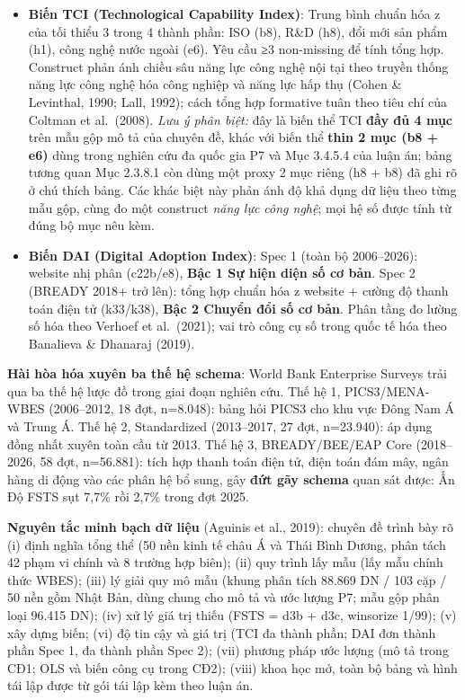 \documentclass[
  a4paper,
  13pt]{extreport}
\begin{document}
\begin{itemize}
{  trực tiếp} của doanh nghiệp (trực tiếp), và được ghi rõ trong phần dữ
  liệu của từng nghiên cứu.
\item
  \textbf{Biến TCI (Technological Capability Index)}: Trung bình chuẩn
  hóa z của tối thiểu 3 trong 4 thành phần: ISO (b8), R\&D (h8), đổi mới
  sản phẩm (h1), công nghệ nước ngoài (e6). Yêu cầu ≥3 non-missing để
  tính tổng hợp. Construct phản ánh chiều sâu năng lực công nghệ nội tại
  theo truyền thống năng lực công nghệ hóa công nghiệp và năng lực hấp
  thụ (Cohen \& Levinthal, 1990; Lall, 1992); cách tổng hợp formative
  tuân theo tiêu chí của Coltman et al.~(2008). \emph{Lưu ý phân biệt:}
  đây là biến thể TCI \textbf{đầy đủ 4 mục} trên mẫu gộp mô tả của
  chuyên đề, khác với biến thể \textbf{thin 2 mục (b8 + e6)} dùng trong
  nghiên cứu đa quốc gia P7 và Mục 3.4.5.4 của luận án; bảng tương quan
  Mục 2.3.8.1 còn dùng một proxy 2 mục riêng (h8 + b8) đã ghi rõ ở chú
  thích bảng. Các khác biệt này phản ánh độ khả dụng dữ liệu theo từng
  mẫu gộp, cùng đo một construct \emph{năng lực công nghệ}; mọi hệ số
  được tính từ đúng bộ mục nêu kèm.
\item
  \textbf{Biến DAI (Digital Adoption Index)}: Spec 1 (toàn bộ
  2006--2026): website nhị phân (c22b/e8), \textbf{Bậc 1 Sự hiện diện số
  cơ bản}. Spec 2 (BREADY 2018+ trở lên): tổng hợp chuẩn hóa z website +
  cường độ thanh toán điện tử (k33/k38), \textbf{Bậc 2 Chuyển đổi số cơ
  bản}. Phân tầng đo lường số hóa theo Verhoef et al.~(2021); vai trò
  công cụ số trong quốc tế hóa theo Banalieva \& Dhanaraj (2019).
\end{itemize}

\textbf{Hài hòa hóa xuyên ba thế hệ schema}: World Bank Enterprise
Surveys trải qua ba thế hệ lược đồ trong giai đoạn nghiên cứu. Thế hệ 1,
PICS3/MENA-WBES (2006--2012, 18 đợt, n=8.048): bảng hỏi PICS3 cho khu
vực Đông Nam Á và Trung Á. Thế hệ 2, Standardized (2013--2017, 27 đợt,
n=23.940): áp dụng đồng nhất xuyên toàn cầu từ 2013. Thế hệ 3,
BREADY/BEE/EAP Core (2018--2026, 58 đợt, n=56.881): tích hợp thanh toán
điện tử, điện toán đám mây, ngân hàng di động vào các phân hệ bổ sung,
gây \textbf{đứt gãy schema} quan sát được: Ấn Độ FSTS sụt 7,7\% rồi
2,7\% trong đợt 2025.

\textbf{Nguyên tắc minh bạch dữ liệu} (Aguinis et al., 2019): chuyên đề
trình bày rõ (i) định nghĩa tổng thể (50 nền kinh tế châu Á và Thái Bình
Dương, phân tách 42 phạm vi chính và 8 trường hợp biên); (ii) quy trình
lấy mẫu (lấy mẫu chính thức WBES); (iii) lý giải quy mô mẫu (khung phân
tích 88.869 DN / 103 cặp / 50 nền gồm Nhật Bản, dùng chung cho mô tả và
ước lượng P7; mẫu gộp phân loại 96.415 DN); (iv) xử lý giá trị thiếu
(FSTS = d3b + d3c, winsorize 1/99); (v) xây dựng biến; (vi) độ tin cậy
và giá trị (TCI đa thành phần; DAI đơn thành phần Spec 1, đa thành phần
Spec 2); (vii) phương pháp ước lượng (mô tả trong CĐ1; OLS và biến công
cụ trong CĐ2); (viii) khoa học mở, toàn bộ bảng và hình tái lập được từ
gói tái lập kèm theo luận án.
\end{document}
